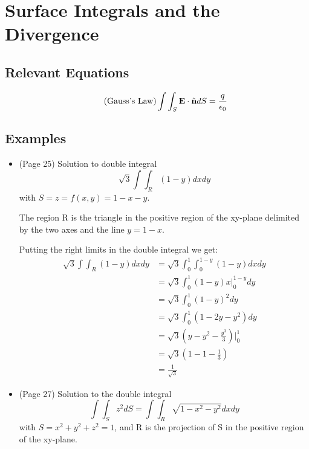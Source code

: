 \documentclass{article}
\begin{document}
\section{Surface Integrals and the Divergence}
\subsection*{Relevant Equations}
\begin{equation}\tag{Gauss's Law}
    \int\int_S \textbf{E} \cdot \hat{\textbf{n}} dS = \frac{q}{\epsilon_0}
\end{equation}

\subsection*{Examples}
\begin{itemize}
    \item (Page 25) Solution to double integral
    \[ \sqrt{3}\int\int_R (1-y) dxdy \]
    with $S = z = f(x,y) = 1-x-y$.

    The region R is the triangle in the positive region of the xy-plane
    delimited by the two axes and the line $y = 1-x$.

    Putting the right limits in the double integral we get:
    \begin{align*}
    \sqrt{3}\int\int_R (1-y) dxdy &= \sqrt{3}\int_0^1\int_0^{1-y} (1-y) dxdy \\
    &= \sqrt{3}\int_0^1 (1-y)x \big|_0^{1-y} dy \\
    &= \sqrt{3}\int_0^1 (1-y)^2 dy \\
    &= \sqrt{3}\int_0^1 (1-2y-y^2) dy \\
    &= \sqrt{3}(y-y^2-\frac{y^3}{3}) \big|_0^1 \\
    &= \sqrt{3}(1-1-\frac{1}{3}) \\
    &= \frac{1}{\sqrt{3}}
    \end{align*}

    \item (Page 27) Solution to the double integral
    \[ \int\int_S z^2dS = \int\int_R \sqrt{1-x^2-y^2}dxdy\]
    with $S = x^2+y^2+z^2 = 1$, and R is the projection of S
    in the positive region of the xy-plane.


\end{itemize}
\end{document}
